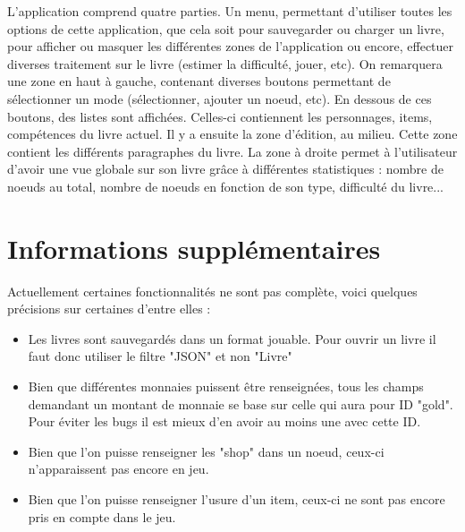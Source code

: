 		L'application comprend quatre parties. Un menu, permettant d'utiliser toutes les options de cette application, que cela soit pour sauvegarder ou charger un livre, pour afficher ou masquer les différentes zones de l'application ou encore, effectuer diverses traitement sur le livre (estimer la difficulté, jouer, etc). On remarquera une zone en haut à gauche, contenant diverses boutons permettant de sélectionner un mode (sélectionner, ajouter un noeud, etc). En dessous de ces boutons, des listes sont affichées. Celles-ci contiennent les personnages, items, compétences du livre actuel. Il y a ensuite la zone d'édition, au milieu. Cette zone contient les différents paragraphes du livre. La zone à droite permet à l'utilisateur d'avoir une vue globale sur son livre grâce à différentes statistiques : nombre de noeuds au total, nombre de noeuds en fonction de son type, difficulté du livre...

	\section{Informations supplémentaires}

		Actuellement certaines fonctionnalités ne sont pas complète, voici quelques précisions sur certaines d'entre elles :

		\begin{itemize}
			\item{Les livres sont sauvegardés dans un format jouable. Pour ouvrir un livre il faut donc utiliser le filtre "JSON" et non "Livre"}
			\item{Bien que différentes monnaies puissent être renseignées, tous les champs demandant un montant de monnaie se base sur celle qui aura pour ID "gold". Pour éviter les bugs il est mieux d'en avoir au moins une avec cette ID.}
			\item{Bien que l'on puisse renseigner les "shop" dans un noeud, ceux-ci n'apparaissent pas encore en jeu.}
			\item{Bien que l'on puisse renseigner l'usure d'un item, ceux-ci ne sont pas encore pris en compte dans le jeu.}
		\end{itemize}
